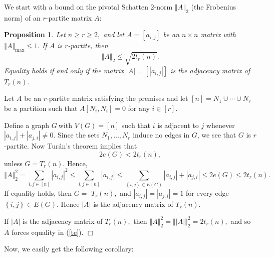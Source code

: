 \documentclass[12pt]{article}%
\newtheorem{proposition}[theorem]{Proposition}
\newenvironment{proof}[1][Proof]{\noindent{\textbf {#1}  }}  {\hfill$\Box$\bigskip}
\begin{document}
We start with a bound on the pivotal Schatten $2$-norm $\left\Vert
A\right\Vert _{2}$ (the Frobenius norm) of an $r$-partite matrix $A$:

\begin{proposition}
\label{pro2}Let $n\geq r\geq2,$ and let $A=\left[  a_{i,j}\right]  $ be an
$n\times n$ matrix with $\left\Vert A\right\Vert _{\max}\leq1.$ If $A$ is
$r$-partite, then%
\begin{equation}
\left\Vert A\right\Vert _{2}\leq\sqrt{2t_{r}\left(  n\right)  }. \label{te}%
\end{equation}
Equality holds if and only if the matrix $\left\vert A\right\vert =\left[
\left\vert a_{i,j}\right\vert \right]  $ is the adjacency matrix of
$T_{r}\left(  n\right)  $.
\end{proposition}

\begin{proof}
Let $A$ be an $r$-partite matrix satisfying the premises and let $\left[
n\right]  =N_{1}\cup\cdots\cup N_{r}$ be a partition such that $A\left[
N_{i},N_{i}\right]  =0$ for any $i\in\left[  r\right]  $.

Define a graph $G\ $with $V\left(  G\right)  =\left[  n\right]  $ such that
$i$ is adjacent to $j$ whenever $\left\vert a_{i,j}\right\vert +\left\vert
a_{j,i}\right\vert \neq0.$ Since the sets $N_{1},\ldots,N_{r}$ induce no edges
in $G$, we see that $G$ is $r$-partite. Now Tur\'{a}n's theorem \cite{Tur41}
implies that
\[
2e\left(  G\right)  <2t_{r}\left(  n\right)  ,
\]
unless $G=T_{r}\left(  n\right)  .$ Hence,
\[
\left\Vert A\right\Vert _{2}^{2}=\sum_{i,j\in\left[  n\right]  }\left\vert
a_{i,j}\right\vert ^{2}\leq\sum_{i,j\in\left[  n\right]  }\left\vert
a_{i,j}\right\vert \leq\sum_{\left\{  i,j\right\}  \in E\left(  G\right)
}\left\vert a_{i,j}\right\vert +\left\vert a_{j,i}\right\vert \leq2e\left(
G\right)  \leq2t_{r}\left(  n\right)  .
\]
If equality holds, then $G=$ $T_{r}\left(  n\right)  ,$ and $\left\vert
a_{i,j}\right\vert =\left\vert a_{j,i}\right\vert =1$ for every edge $\left\{
i,j\right\}  \in E\left(  G\right)  $. Hence $\left\vert A\right\vert $ is the
adjacency matrix of $T_{r}\left(  n\right)  $.

If $\left\vert A\right\vert $ is the adjacency matrix of $T_{r}\left(
n\right)  ,$ then $\left\Vert A\right\Vert _{2}^{2}=\left\Vert \left\vert
A\right\vert \right\Vert _{2}^{2}=2t_{r}\left(  n\right)  ,$ and so $A$ forces
equality in (\ref{te}).
\end{proof}

Now, we easily get the following corollary:
\end{document}
